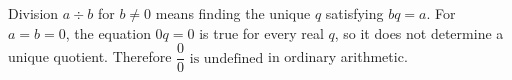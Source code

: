 Division $a\div b$ for $b\ne0$ means finding the unique $q$ satisfying $bq=a$. For $a=b=0$, the equation $0q=0$ is true for every real $q$, so it does not determine a unique quotient. Therefore $\boxed{\dfrac{0}{0}\text{ is undefined}}$ in ordinary arithmetic.
